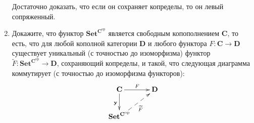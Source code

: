\documentclass[draft]{article}
\newcommand{\cat}[1]{\mathbf{#1}}
\renewcommand{\C}{\cat{C}}
\newcommand{\D}{\cat{D}}
\newcommand{\Set}{\cat{Set}}
\newcommand{\fs}[1]{\mathrm{#1}}
\newcommand{\op}{\fs{op}}
\begin{document}
\begin{enumerate}
Достаточно доказать, что если он сохраняет копределы, то он левый сопряженный.\\


\item Докажите, что функтор $\Set^{\C^\op}$ является свободным копополнением $\C$, то есть, что для любой кополной категории $\D$ и любого функтора $F : \C \to \D$
существует уникальный (с точностью до изоморфизма) функтор $\widetilde{F} : \Set^{\C^\op} \to \D$, сохраняющий копределы, и такой, что следующая диаграмма коммутирует (с точностью до изоморфизма функторов):
\[ \xymatrix{ \C \ar[r]^F \ar[d]_{\cat{y}}                 & \D \\
              \Set^{\C^\op} \ar@{-->}[ur]_{\widetilde{F}}
            } \]

\end{enumerate}
\end{document}
